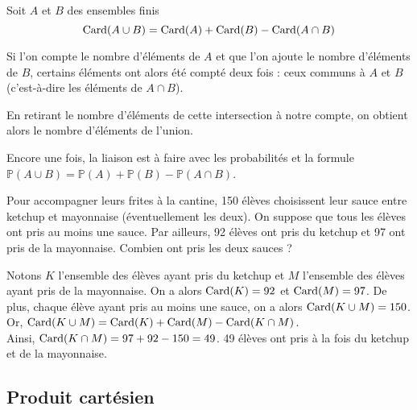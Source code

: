 \documentclass[11pt,fleqn, openany]{book} %
\begin{document}
\begin{proposition}
Soit $A$ et $B$ des ensembles finis
\[ \mathrm{Card}(A \cup B) = \mathrm{Card}(A) + \mathrm{Card}(B) - \mathrm{Card}( A\cap B)\]\vspace{-0.5cm}\end{proposition}
\begin{minipage}{0.65\linewidth}
Si l'on compte le nombre d'éléments de $A$ et que l'on ajoute le nombre d'éléments de $B$, certains éléments ont alors été compté deux fois : ceux communs à $A$ et $B$ (c'est-à-dire les éléments de $A\cap B$).

En retirant le nombre d'éléments de cette intersection à notre compte, on obtient alors le nombre d'éléments de l'union.
\end{minipage}\hfill\begin{minipage}{0.3\linewidth}
\newcommand{\A}{(0,0) ++(135:2) circle (2)}
\newcommand{\B}{(0,0) ++(45:2) circle (2)}
\end{minipage}

Encore une fois, la liaison est à faire avec les probabilités et la formule $\mathbb{P}(A\cup B)=\mathbb{P}(A)+\mathbb{P}(B)-\mathbb{P}(A \cap B)$.

\begin{example}Pour accompagner leurs frites à la cantine, 150 élèves choisissent leur sauce entre ketchup et mayonnaise (éventuellement les deux). On suppose que tous les élèves ont pris au moins une sauce. Par ailleurs, 92 élèves ont pris du ketchup et 97 ont pris de la mayonnaise. Combien ont pris les deux sauces ?

Notons $K$ l'ensemble des élèves ayant pris du ketchup et $M$ l'ensemble des élèves ayant pris de la mayonnaise. On a alors $\mathrm{Card}(K)=92$ et $\mathrm{Card}(M)=97$. De plus, chaque élève ayant pris au moins une sauce, on a alors $\mathrm{Card}(K \cup M)=150$. Or, $\mathrm{Card}(K \cup M)=\mathrm{Card}(K)+\mathrm{Card}(M)-\mathrm{Card}(K \cap M)$. \\Ainsi, $\mathrm{Card}(K\cap M)=97+92-150=49$. 49 élèves ont pris à la fois du ketchup et de la mayonnaise.\end{example}
\newpage
\subsection{Produit cartésien}
\end{document}
